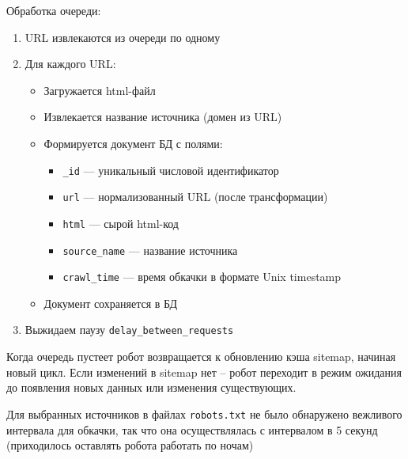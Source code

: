 Обработка очереди:
\begin{enumerate}
    \item URL извлекаются из очереди по одному
    \item Для каждого URL:
    \begin{itemize}
        \item Загружается html-файл
        \item Извлекается название источника (домен из URL)
        \item Формируется документ БД с полями:
        \begin{itemize}
            \item \texttt{\_id} — уникальный числовой идентификатор
            \item \texttt{url} — нормализованный URL (после трансформации)
            \item \texttt{html} — сырой html-код
            \item \texttt{source\_name} — название источника
            \item \texttt{crawl\_time} — время обкачки в формате Unix timestamp
        \end{itemize}
        \item Документ сохраняется в БД
    \end{itemize}
    \item Выжидаем паузу \texttt{delay\_between\_requests}
\end{enumerate}

Когда очередь пустеет робот возвращается к обновлению кэша sitemap, начиная новый цикл. Если изменений в sitemap нет -- робот переходит в режим ожидания до появления новых данных или изменения существующих.

Для выбранных источников в файлах \texttt{robots.txt} не было обнаружено вежливого интервала для обкачки, так что она осуществлялась с интервалом в 5 секунд (приходилось оставлять робота работать по ночам)

\pagebreak

